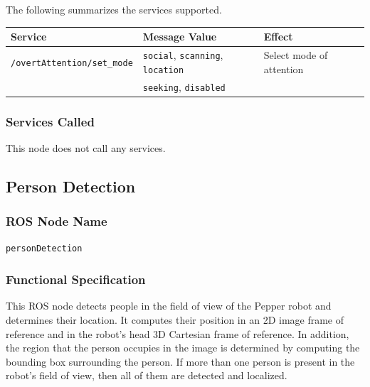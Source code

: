 \documentclass{CSSRforAfrica}
\begin{document}
{{The following summarizes the services supported.

\begin{center}
\begin{tabularx}{\linewidth}{| l | l | X|}
\hline 
{\small Service }                                                                                & {\small Message Value}    &  {\small Effect}       \\
\hline
{\footnotesize \verb+/overtAttention/set_mode+ }  & {\footnotesize \verb+social+,   \verb+scanning+, \verb+location+ } & {\small Select mode of attention} \\ 
                                                                               & {\footnotesize \verb+seeking+,   \verb+disabled+ } & \\ 
\hline
\end{tabularx}
\end{center}

\subsubsection*{Services Called}
This node does not call any services.







\newpage

\subsection{Person Detection }

\subsubsection*{ROS Node Name}
 {\small \verb+personDetection+}   

\subsubsection*{Functional Specification}
This ROS node detects  people in the field of view of the Pepper robot and determines their location. It computes their position in an 2D image frame of reference and in the robot's head 3D Cartesian frame of reference.   In addition, the region that the person occupies in the image is determined by computing the bounding box surrounding the person. If more than one person is present in the robot's field of view, then all of them are detected and localized.  

}}
\end{document}
